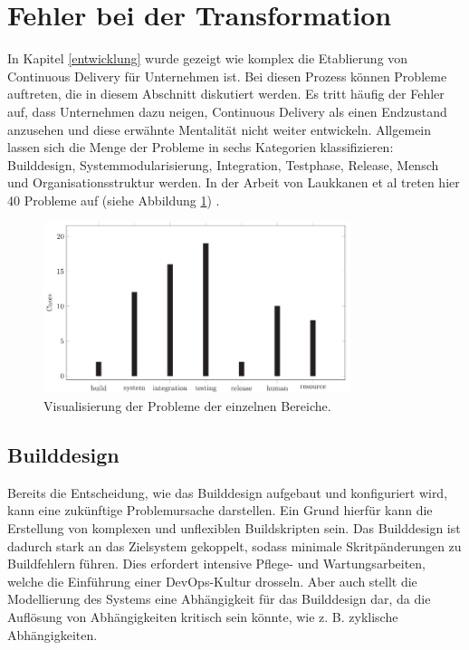 \section{Fehler bei der Transformation} \label{Fehler bei der Transformation}
In Kapitel \ref{entwicklung} wurde gezeigt wie komplex die Etablierung von Continuous Delivery für Unternehmen ist. Bei diesen Prozess können Probleme auftreten, die in diesem Abschnitt diskutiert werden. Es tritt häufig der Fehler auf, dass Unternehmen dazu neigen, Continuous Delivery als einen Endzustand anzusehen und diese erwähnte Mentalität nicht weiter entwickeln. Allgemein lassen sich die Menge der Probleme in sechs Kategorien klassifizieren: Builddesign, Systemmodularisierung, Integration, Testphase, Release, Mensch und Organisationsstruktur werden. In der Arbeit von Laukkanen et al treten hier 40 Probleme auf (siehe Abbildung \ref{studie}) \cite{Laukkanen.2017}. 

\begin{figure}[ht]
	\centering
	\includegraphics[width=0.8\textwidth,]{images/Transformationproblems}
	\caption{Visualisierung der Probleme der einzelnen Bereiche\cite{Laukkanen.2017}.}
	\label{studie}
\end{figure}

\subsection{Builddesign} \label{builddesgin}
Bereits die Entscheidung, wie das Builddesign aufgebaut und konfiguriert wird, kann eine zukünftige Problemursache darstellen. Ein Grund hierfür kann die Erstellung von komplexen und unflexiblen Buildskripten sein. Das Builddesign ist dadurch stark an das Zielsystem gekoppelt, sodass minimale Skritpänderungen zu Buildfehlern führen. Dies erfordert intensive Pflege- und Wartungsarbeiten, welche die Einführung einer DevOps-Kultur drosseln. Aber auch stellt die Modellierung des Systems eine Abhängigkeit für das Builddesign dar, da die Auflösung von Abhängigkeiten kritisch sein könnte, wie z. B. zyklische Abhängigkeiten.

